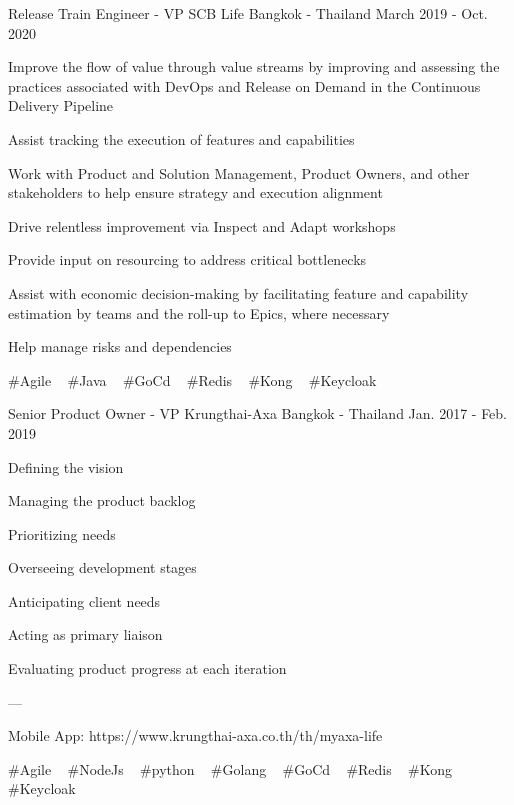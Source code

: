 \begin{cventries}
  \cventry
    {Release Train Engineer - VP} %
    {SCB Life} %
    {Bangkok - Thailand} %
    {March 2019 - Oct. 2020} %
    {
      \begin{cvitems} %
        \item {Improve the flow of value through value streams by improving and assessing the practices associated with DevOps and Release on Demand in the Continuous Delivery Pipeline}
        \item {Assist tracking the execution of features and capabilities}
        \item {Work with Product and Solution Management, Product Owners, and other stakeholders to help ensure strategy and execution alignment}
        \item {Drive relentless improvement via Inspect and Adapt workshops}
        \item {Provide input on resourcing to address critical bottlenecks}
        \item {Assist with economic decision-making by facilitating feature and capability estimation by teams and the roll-up to Epics, where necessary}
        \item {Help manage risks and dependencies}
      \end{cvitems}
    }
    {
      \#Agile ~
      \#Java ~
      \#GoCd ~
      \#Redis ~
      \#Kong ~
      \#Keycloak ~
    }

  \cventry
    {Senior Product Owner - VP} %
    {Krungthai-Axa} %
    {Bangkok - Thailand} %
    {Jan. 2017 - Feb. 2019} %
    {
      \begin{cvitems} %
        \item {Defining the vision}
        \item {Managing the product backlog}
        \item {Prioritizing needs}
        \item {Overseeing development stages}
        \item {Anticipating client needs}
        \item {Acting as primary liaison}
        \item {Evaluating product progress at each iteration}
        \item {---}
        \item {Mobile App: https://www.krungthai-axa.co.th/th/myaxa-life}
      \end{cvitems}
    }
    {
      \#Agile ~
      \#NodeJs ~
      \#python ~
      \#Golang ~
      \#GoCd ~
      \#Redis ~
      \#Kong ~
      \#Keycloak ~
    }


\end{cventries}
